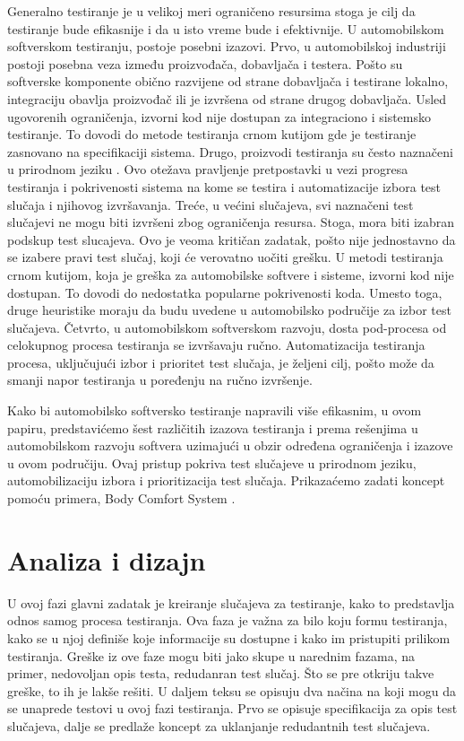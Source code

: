 \documentclass[a4paper]{article}
\begin{document}
Generalno testiranje je u velikoj meri ograničeno resursima stoga je cilj da testiranje bude efikasnije i da u isto vreme bude i efektivnije. U automobilskom softverskom testiranju, postoje posebni izazovi. Prvo, u automobilskoj industriji postoji posebna veza između proizvođača, dobavljača i testera. Pošto su softverske komponente obično razvijene od strane dobavljača i testirane lokalno, integraciju obavlja proizvođač ili je izvršena od strane drugog dobavljača. Usled ugovorenih ograničenja, izvorni kod nije dostupan za integraciono i sistemsko testiranje. To dovodi do metode testiranja crnom kutijom gde je testiranje zasnovano na specifikaciji sistema. Drugo, proizvodi testiranja su često naznačeni u prirodnom jeziku \cite{ref20}. Ovo otežava pravljenje pretpostavki u vezi progresa testiranja i pokrivenosti sistema na kome se testira i automatizacije izbora test slučaja i njihovog izvršavanja. Treće, u većini slučajeva, svi naznačeni test slučajevi ne mogu biti izvršeni zbog ograničenja resursa. Stoga, mora biti izabran podskup test slucajeva. Ovo je veoma kritičan zadatak, pošto nije jednostavno da se izabere pravi test slučaj, koji će verovatno uočiti grešku. U metodi testiranja crnom kutijom, koja je greška za automobilske softvere i sisteme, izvorni kod nije dostupan. To dovodi do nedostatka popularne pokrivenosti koda. Umesto toga, druge heuristike moraju da budu uvedene u automobilsko područije za izbor test slučajeva. Četvrto, u automobilskom softverskom razvoju, dosta pod-procesa od celokupnog procesa testiranja se izvršavaju ručno. Automatizacija testiranja procesa, uključujući izbor i prioritet test slučaja, je željeni cilj, pošto može da smanji napor testiranja u poređenju na ručno izvršenje\cite{ref16}.
\bigbreak

Kako bi automobilsko softversko testiranje napravili više efikasnim, u ovom papiru, predstavićemo šest različitih izazova testiranja i prema rešenjima u automobilskom razvoju softvera uzimajući u obzir određena ograničenja i izazove u ovom područiju. Ovaj pristup pokriva test slučajeve u prirodnom jeziku, automobilizaciju izbora i prioritizacija test slučaja. Prikazaćemo zadati koncept pomoću primera, Body Comfort System \cite{ref17}.
\bigbreak
 
\section{Analiza i dizajn}
\label{sec:analiza}

U ovoj fazi glavni zadatak je kreiranje slučajeva za testiranje, kako to predstavlja odnos samog procesa testiranja. Ova faza je važna za bilo koju formu testiranja, kako se u njoj definiše koje informacije su dostupne i kako im pristupiti prilikom testiranja. Greške iz ove faze mogu biti jako skupe u narednim fazama, na primer, nedovoljan opis testa, redudanran test slučaj. Što se pre otkriju takve greške, to ih je lakše rešiti.
U daljem teksu se opisuju dva načina na koji mogu da se unaprede testovi u ovoj fazi testiranja. Prvo se opisuje specifikacija za opis test slučajeva, dalje se predlaže koncept za uklanjanje redudantnih test slučajeva.
\end{document}
